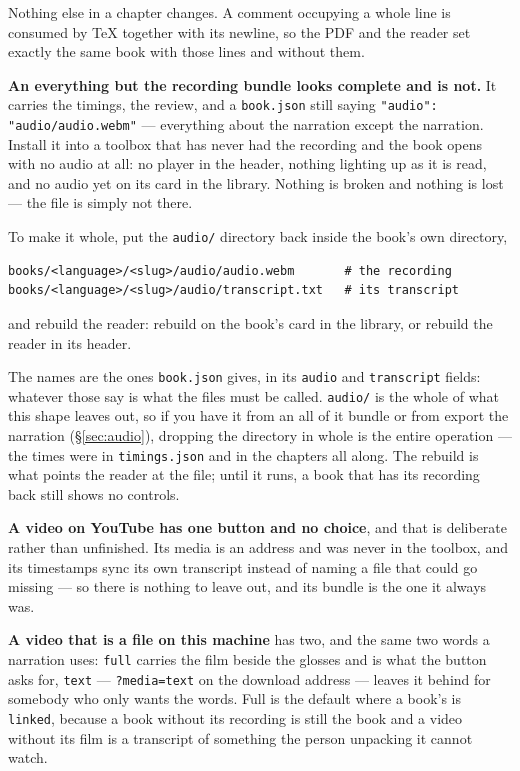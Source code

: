 \documentclass[11pt,oneside]{report}
\newcommand{\file}[1]{\texttt{#1}}
\newcommand{\menu}[1]{\textsf{#1}}
\begin{document}
\noindent Nothing else in a chapter changes. A comment occupying a whole
line is consumed by \TeX{} together with its newline, so the PDF and the
reader set exactly the same book with those lines and without them.

\begin{warnbox}
\textbf{An \menu{everything but the recording} bundle looks complete and
is not.} It carries the timings, the review, and a \file{book.json} still
saying \texttt{"audio": "audio/audio.webm"} --- everything about the
narration except the narration. Install it into a toolbox that has never had
the recording and the book opens with no audio at all: no player in the
header, nothing lighting up as it is read, and \menu{no audio yet} on its
card in the library. Nothing is broken and nothing is lost --- the file is
simply not there.

To make it whole, put the \file{audio/} directory back inside the book's own
directory,

\begin{lstlisting}
books/<language>/<slug>/audio/audio.webm       # the recording
books/<language>/<slug>/audio/transcript.txt   # its transcript
\end{lstlisting}

\noindent and rebuild the reader: \menu{rebuild} on the book's card in the
library, or \menu{rebuild the reader} in its header.

\noindent The names are the ones \file{book.json} gives, in its
\texttt{audio} and \texttt{transcript} fields: whatever those say is what the
files must be called. \file{audio/} is the whole of what this shape leaves
out, so if you have it from an \menu{all of it} bundle or from
\menu{export the narration} (\S\ref{sec:audio}), dropping the directory in
whole is the entire operation --- the times were in \file{timings.json} and
in the chapters all along. The rebuild is what points the reader at the
file; until it runs, a book that has its recording back still shows no
controls.
\end{warnbox}

\textbf{A video on YouTube has one button and no choice}, and that is
deliberate rather than unfinished. Its media is an address and was never in
the toolbox, and its timestamps sync its own transcript instead of naming a
file that could go missing --- so there is nothing to leave out, and its
bundle is the one it always was.

\textbf{A video that is a file on this machine} has two, and the same two
words a narration uses: \texttt{full} carries the film beside the glosses
and is what the button asks for, \texttt{text} --- \texttt{?media=text} on
the download address --- leaves it behind for somebody who only wants the
words. Full is the default where a book's is \texttt{linked}, because a book
without its recording is still the book and a video without its film is a
transcript of something the person unpacking it cannot watch.
\end{document}
